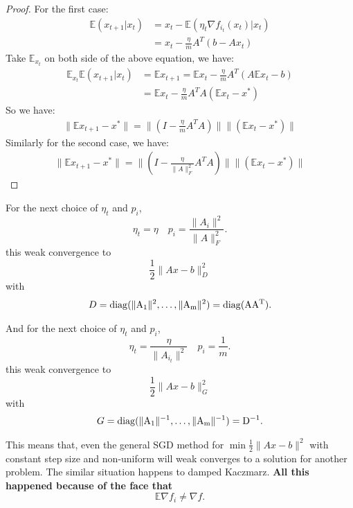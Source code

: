 \begin{proof}
	For the first case:
	\begin{align}
	\mathbb{E}( x_{t+1}| x_t) &= x_t - \mathbb{E}(\eta_t \nabla f_{i_t}(x_t) | x_t) \\
	&= x_t - \frac{\eta}{m}A^T(b - Ax_t)
	\end{align}
	Take $\mathbb{E}_{x_t}$ on both side of the above equation, we have:
	\begin{align}
	\mathbb{E}_{x_t}\mathbb{E}( x_{t+1}| x_t) &= \mathbb{E}x_{t+1} 
	= \mathbb{E}x_t - \frac{\eta}{m}A^T(A\mathbb{E}x_t - b) \\
	&= \mathbb{E}x_t - \frac{\eta}{m}A^TA( \mathbb{E}x_t - x^*)
	\end{align}
	So we have:
	\begin{align}
	\|\mathbb{E}x_{t+1} - x^*\|
	= \|(I - \frac{\eta}{m}A^TA)\| \|(\mathbb{E}x_t - x^*)\|
	\end{align}
	Similarly for the second case, we have:
	\begin{align}
	\|\mathbb{E}x_{t+1} - x^*\|
	= \|(I - \frac{\eta}{\|A\|_F^2}A^TA)\| \|(\mathbb{E}x_t - x^*)\|
	\end{align}
\end{proof}


\begin{theorem}
	For the next choice of $\eta_t$ and $p_i$, 
	\begin{equation}
	\eta_t = \eta \quad p_i = \frac{\|A_i\|^2}{\|A\|_F^2}.
	\end{equation}
	this weak convergence to 
	\begin{equation}
	\frac{1}{2}\|Ax - b\|^2_{D}
	\end{equation}
	with 
	\begin{align}
	D = \rm{diag}(\|A_1\|^2, \ldots, \|A_m\|^2) = \rm{diag}(AA^T).
	\end{align}
	
	And for the next choice of $\eta_t$ and $p_i$,
	\begin{equation}
	\eta_t = \frac{\eta}{\|A_{i_t}\|^2} \quad p_i = \frac{1}{m}.
	\end{equation}
	this weak convergence to 
	\begin{equation}
	\frac{1}{2}\|Ax - b\|^2_{G}
	\end{equation}
	with 
	\begin{align}
	G = \rm{diag}(\|A_1\|^{-1}, \ldots, \|A_m\|^{-1}) = D^{-1}.
	\end{align}
\end{theorem}
This means that, even the general SGD method for $\min \frac{1}{2}\|Ax-b\|^2$ with constant step size and non-uniform will weak converges to a solution for another problem. The similar situation happens to damped Kaczmarz. {\bf All this happened because of the face that
	\begin{equation}
	\mathbb{E} \nabla f_i \neq \nabla f.
	\end{equation}}


